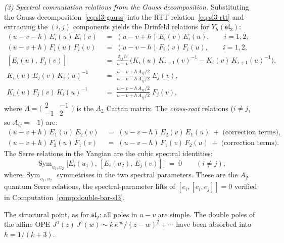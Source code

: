 \begin{example}
\medskip
\noindent\emph{(3) Spectral commutation relations from the
Gauss decomposition.}
Substituting the Gauss decomposition~\eqref{eq:sl3-gauss}
into the RTT relation~\eqref{eq:sl3-rtt} and extracting
the $(i,j)$ components yields the Drinfeld
relations for $Y_\hbar(\mathfrak{sl}_3)$:
\begin{align}
(u{-}v{-}\hbar)\,E_i(u)\,E_i(v)
&\;=\;
(u{-}v{+}\hbar)\,E_i(v)\,E_i(u),
\qquad i = 1,2,
\label{eq:sl3-EiEi}\\[3pt]
(u{-}v{+}\hbar)\,F_i(u)\,F_i(v)
&\;=\;
(u{-}v{-}\hbar)\,F_i(v)\,F_i(u),
\qquad i = 1,2,
\label{eq:sl3-FiFi}\\[3pt]
[E_i(u),\,F_j(v)]
&\;=\;
\frac{\delta_{ij}\,\hbar}{u{-}v}\,
\bigl(K_i(u)\,K_{i+1}(v)^{-1}
- K_i(v)\,K_{i+1}(u)^{-1}\bigr),
\label{eq:sl3-EF}\\[3pt]
K_i(u)\,E_j(v)\,K_i(u)^{-1}
&\;=\;
\frac{u-v+\hbar\,A_{ij}/2}
{u-v-\hbar\,A_{ij}/2}\;E_j(v),
\label{eq:sl3-KE}\\[3pt]
K_i(u)\,F_j(v)\,K_i(u)^{-1}
&\;=\;
\frac{u-v-\hbar\,A_{ij}/2}
{u-v+\hbar\,A_{ij}/2}\;F_j(v),
\label{eq:sl3-KF}
\end{align}
where $A = \bigl(\begin{smallmatrix}2&-1\\-1&2\end{smallmatrix}\bigr)$ is the $A_2$ Cartan matrix.
The \emph{cross-root} relations ($i\neq j$, so $A_{ij}=-1$)
are:
\begin{align}
(u{-}v{+}\hbar)\,E_1(u)\,E_2(v)
&\;=\;
(u{-}v{-}\hbar)\,E_2(v)\,E_1(u)
\;+\;\text{(correction terms)},
\label{eq:sl3-E1E2}\\[3pt]
(u{-}v{+}\hbar)\,F_2(u)\,F_1(v)
&\;=\;
(u{-}v{-}\hbar)\,F_1(v)\,F_2(u)
\;+\;\text{(correction terms)}.
\label{eq:sl3-F2F1}
\end{align}
The Serre relations in the Yangian are the cubic spectral
identities:
\begin{equation}\label{eq:sl3-serre}
\operatorname{Sym}_{u_1,u_2}
\bigl[E_i(u_1),\,[E_i(u_2),\,E_j(v)]\bigr]
\;=\;0
\qquad(i\neq j),
\end{equation}
where $\operatorname{Sym}_{u_1,u_2}$ symmetrises in the
two spectral parameters. These are the $A_2$ quantum Serre
relations, the spectral-parameter lifts of
$[e_i,[e_i,e_j]] = 0$ verified in
Computation~\ref{comp:double-bar-sl3}.

The structural point, as for $\mathfrak{sl}_2$: all poles
in $u{-}v$ are simple. The double poles of the affine OPE
$J^a(z)\,J^b(w) \sim k\,\kappa^{ab}/(z{-}w)^2 + \cdots$
have been absorbed into $\hbar = 1/(k{+}3)$.


\end{example}
